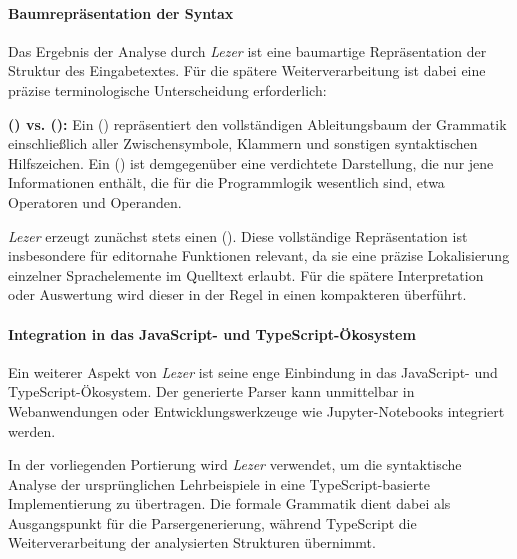 \paragraph{Baumrepräsentation der Syntax}

Das Ergebnis der Analyse durch \emph{Lezer} ist eine baumartige Repräsentation der Struktur des Eingabetextes. Für die spätere Weiterverarbeitung ist dabei eine präzise terminologische Unterscheidung erforderlich:

\begin{definition}
\label{def:cst-vs-ast}
\textbf{ () vs.  ():}
Ein  () repräsentiert den vollständigen Ableitungsbaum der Grammatik einschließlich aller Zwischensymbole, Klammern und sonstigen syntaktischen Hilfszeichen. Ein  () ist demgegenüber eine verdichtete Darstellung, die nur jene Informationen enthält, die für die Programmlogik wesentlich sind, etwa Operatoren und Operanden.
\end{definition}

\emph{Lezer} erzeugt zunächst stets einen  (). Diese vollständige Repräsentation ist insbesondere für editornahe Funktionen relevant, da sie eine präzise Lokalisierung einzelner Sprachelemente im Quelltext erlaubt. Für die spätere Interpretation oder Auswertung wird dieser  in der Regel in einen kompakteren  überführt.

\paragraph{Integration in das JavaScript- und TypeScript-Ökosystem}

Ein weiterer Aspekt von \emph{Lezer} ist seine enge Einbindung in das JavaScript- und TypeScript-Ökosystem. Der generierte Parser kann unmittelbar in Webanwendungen oder Entwicklungswerkzeuge wie Jupyter-Notebooks integriert werden.

In der vorliegenden Portierung wird \emph{Lezer} verwendet, um die syntaktische Analyse der ursprünglichen Lehrbeispiele in eine TypeScript-basierte Implementierung zu übertragen. Die formale Grammatik dient dabei als Ausgangspunkt für die Parsergenerierung, während TypeScript die Weiterverarbeitung der analysierten Strukturen übernimmt.

